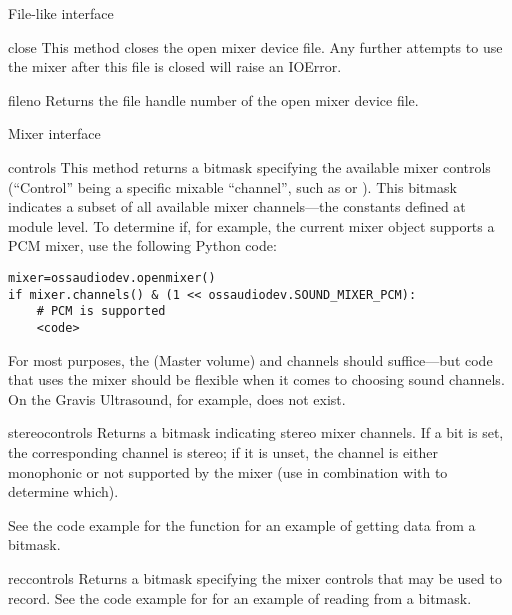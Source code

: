 File-like interface

\begin{methoddesc}{close}{}
This method closes the open mixer device file.  Any further attempts to
use the mixer after this file is closed will raise an IOError.
\end{methoddesc}

\begin{methoddesc}{fileno}{}
Returns the file handle number of the open mixer device file.
\end{methoddesc}

Mixer interface

\begin{methoddesc}{controls}{}
This method returns a bitmask specifying the available mixer controls
(``Control'' being a specific mixable ``channel'', such as
 or ).  This
bitmask indicates a subset of all available mixer channels---the
 constants defined at module level.  To determine if,
for example, the current mixer object supports a PCM mixer, use the
following Python code:

\begin{verbatim}
mixer=ossaudiodev.openmixer()
if mixer.channels() & (1 << ossaudiodev.SOUND_MIXER_PCM):
	# PCM is supported
	<code>
\end{verbatim}

For most purposes, the  (Master volume) and
 channels should suffice---but code that uses the
mixer should be flexible when it comes to choosing sound channels.  On
the Gravis Ultrasound, for example,  does not
exist.
\end{methoddesc}

\begin{methoddesc}{stereocontrols}{}
Returns a bitmask indicating stereo mixer channels.  If a bit is set,
the corresponding channel is stereo; if it is unset, the channel is
either monophonic or not supported by the mixer (use in combination with
 to determine which).

See the code example for the  function for an example
of getting data from a bitmask.
\end{methoddesc}

\begin{methoddesc}{reccontrols}{}
Returns a bitmask specifying the mixer controls that may be used to
record.  See the code example for  for an example of
reading from a bitmask.
\end{methoddesc}

